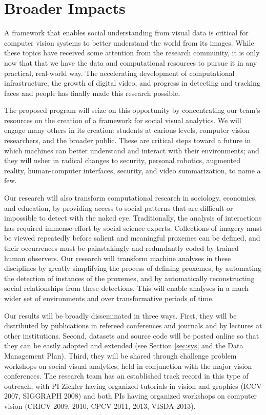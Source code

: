 \vspace{-8pt}
\section{Broader Impacts}
\label{sec:impacts}
\vspace{-8pt}
A framework that enables social understanding from visual data is critical for computer vision systems to better understand the world from its images. While these topics have received some attention from the research community, it is only now that that we have the data and computational resources to pursue it in any practical, real-world way. The accelerating development of computational infrastructure, the growth of digital video, and progress in detecting and tracking faces and people has finally made this research possible. 

The proposed  program will seize on this opportunity by concentrating our team's resources on the creation of a  framework for social visual analytics.  We will engage many others in its creation: students at carious levels, computer vision researchers, and the broader public. These are critical steps toward a future in which machines can better understand and interact with their environments; and they will usher in radical changes to security, personal robotics, augmented reality, human-computer interfaces, security, and video summarization, to name a few.

Our research will also transform computational research in sociology, economics, and education, by providing access to social patterns that are difficult or impossible to detect with the naked eye. Traditionally, the analysis of interactions has required immense effort by social science experts. Collections of imagery must be viewed repeatedly before salient and meaningful proxemes can be defined, and their occurrences must be painstakingly and redundantly coded by trained human observers. Our research will transform machine analyses in these disciplines by greatly simplifying the process of defining proxemes, by automating the detection of instances of the proxemes, and by automatically reconstructing social relationships from these detections. This will enable analyses in a much wider set of environments and over transformative periods of time.

Our results will be broadly disseminated in three ways. First, they will be distributed by publications in refereed conferences and journals and by lectures at other institutions.  Second, datasets and source code will be posted online so that they can be easily adopted and extended (see Section \ref{sec:sys} and the Data Management Plan). Third, they will be shared through challenge problem workshops on social visual analytics, held in conjunction with the major vision conferences. The research team has an established track record in this type of outreach, with PI Zickler having organized tutorials in vision and  graphics (ICCV 2007, SIGGRAPH 2008) and both PIs having organized workshops on computer vision (CRICV 2009, 2010, CPCV 2011, 2013, VISDA 2013).

